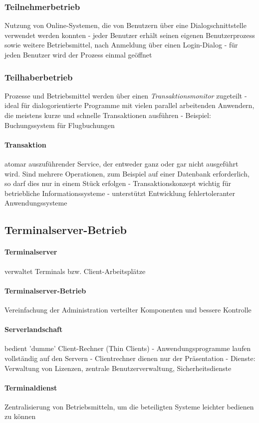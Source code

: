 \documentclass[10pt,a4paper,landscape]{article}
\begin{document}
\begin{multicols*}{3}
	\subsubsection{Teilnehmerbetrieb}
	Nutzung von Online-Systemen, die von Benutzern über eine Dialogschnittstelle verwendet werden konnten - jeder Benutzer erhält seinen eigenen Benutzerprozess sowie weitere Betriebsmittel, nach Anmeldung über einen Login-Dialog - für jeden Benutzer wird der Prozess einmal geöffnet
	\subsubsection{Teilhaberbetrieb}
	Prozesse und Betriebsmittel werden über einen \textit{Transaktionsmonitor} zugeteilt - ideal für dialogorientierte Programme mit vielen parallel arbeitenden Anwendern, die meistens kurze und schnelle Transaktionen ausführen - Beispiel: Buchungssystem für Flugbuchungen
	\paragraph{Transaktion} atomar auszuführender Service, der entweder ganz oder gar nicht ausgeführt wird. Sind mehrere Operationen, zum Beispiel auf einer Datenbank erforderlich, so darf dies nur in einem Stück erfolgen - Transaktionskonzept wichtig für betriebliche Informationssysteme - unterstützt Entwicklung fehlertoleranter Anwendungssysteme
	\subsection{Terminalserver-Betrieb}
	\paragraph{Terminalserver} verwaltet Terminals bzw. Client-Arbeitsplätze
	\paragraph{Terminalserver-Betrieb} Vereinfachung der Administration verteilter Komponenten und bessere Kontrolle
	\paragraph{Serverlandschaft} bedient 'dumme' Client-Rechner (Thin Clients) - Anwendungsprogramme laufen vollständig auf den Servern - Clientrechner dienen nur der Präsentation - Dienste: Verwaltung von Lizenzen, zentrale Benutzerverwaltung, Sicherheitsdienste
	\paragraph{Terminaldienst} Zentralisierung von Betriebsmitteln, um die beteiligten Systeme leichter bedienen zu können

\end{multicols*}
\end{document}
